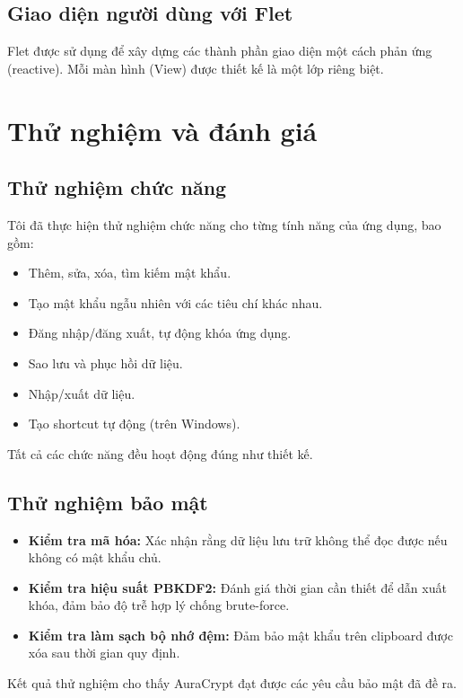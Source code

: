 \subsection{Giao diện người dùng với Flet}
Flet được sử dụng để xây dựng các thành phần giao diện một cách phản ứng (reactive). Mỗi màn hình (View) được thiết kế là một lớp riêng biệt.


\section{Thử nghiệm và đánh giá}
\subsection{Thử nghiệm chức năng}
Tôi đã thực hiện thử nghiệm chức năng cho từng tính năng của ứng dụng, bao gồm:
\begin{itemize}
    \item Thêm, sửa, xóa, tìm kiếm mật khẩu.
    \item Tạo mật khẩu ngẫu nhiên với các tiêu chí khác nhau.
    \item Đăng nhập/đăng xuất, tự động khóa ứng dụng.
    \item Sao lưu và phục hồi dữ liệu.
    \item Nhập/xuất dữ liệu.
    \item Tạo shortcut tự động (trên Windows).
\end{itemize}
Tất cả các chức năng đều hoạt động đúng như thiết kế.

\subsection{Thử nghiệm bảo mật}
\begin{itemize}
    \item \textbf{Kiểm tra mã hóa:} Xác nhận rằng dữ liệu lưu trữ không thể đọc được nếu không có mật khẩu chủ.
    \item \textbf{Kiểm tra hiệu suất PBKDF2:} Đánh giá thời gian cần thiết để dẫn xuất khóa, đảm bảo độ trễ hợp lý chống brute-force.
    \item \textbf{Kiểm tra làm sạch bộ nhớ đệm:} Đảm bảo mật khẩu trên clipboard được xóa sau thời gian quy định.
\end{itemize}
Kết quả thử nghiệm cho thấy AuraCrypt đạt được các yêu cầu bảo mật đã đề ra.

